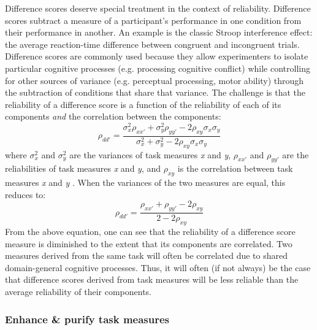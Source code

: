\documentclass[a4paper,12pt]{article}
\begin{document}
Difference scores deserve special treatment in the context of reliability. Difference scores subtract a measure of a participant's performance in one condition from their performance in another. An example is the classic Stroop interference effect: the average reaction-time difference between congruent and incongruent trials. Difference scores are commonly used because they allow experimenters to isolate particular cognitive processes (e.g. processing cognitive conflict) while controlling for other sources of variance (e.g. perceptual processing, motor ability) through the subtraction of conditions that share that variance. The challenge is that the reliability of a difference score is a function of the reliability of each of its components \textit{and} the correlation between the components:
\begin{equation}
    \rho_{dd'} = \frac{\sigma^2_x \rho_{xx'} + \sigma^2_y \rho_{yy'} - 2 \rho_{xy} \sigma_x \sigma_y}{\sigma^2_x + \sigma^2_y - 2 \rho_{xy} \sigma_x \sigma_y}
\end{equation}
where $\sigma^2_x$ and $\sigma^2_y$ are the variances of task measures \textit{x} and \textit{y}, $\rho_{xx'}$ and $\rho_{yy'}$ are the reliabilities of task measures \textit{x} and \textit{y}, and $\rho_{xy}$ is the correlation between task measures \textit{x} and \textit{y} \cite{chiou1996reliability}. When the variances of the two measures are equal, this reduces to: 
\begin{equation}
    \rho_{dd'} = \frac{\rho_{xx'} + \rho_{yy'} - 2 \rho_{xy}}{2 - 2 \rho_{xy}}
\end{equation}
From the above equation, one can see that the reliability of a difference score measure is diminished to the extent that its components are correlated. Two measures derived from the same task will often be correlated due to shared domain-general cognitive processes. Thus, it will often (if not always) be the case that difference scores derived from task measures will be less reliable than the average reliability of their components. 

\subsubsection{Enhance \& purify task measures}
\end{document}
